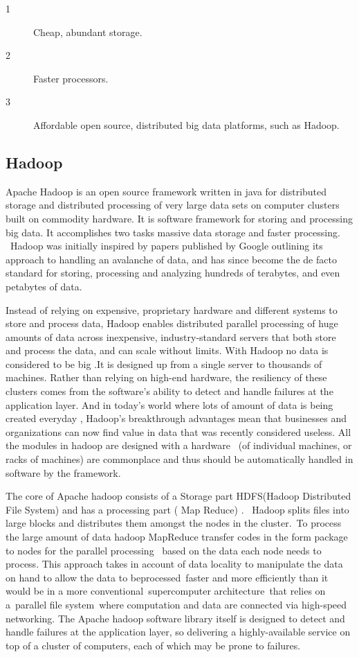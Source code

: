 \begin{description}
\vspace*{-2mm}
\item[1]Cheap, abundant storage.
\vspace*{-2mm}
\item[2]Faster processors.
\vspace*{-2mm}
\item[3]Affordable open source, distributed big data platforms, such as Hadoop.
\end{description}

\subsection{Hadoop}\cite{hadoop}
Apache Hadoop is an open source framework written in java for distributed storage and distributed processing of very large data sets on computer clusters built on commodity hardware. It is software framework for storing and processing big data.  It accomplishes two tasks massive data storage and faster processing.  Hadoop was initially inspired by papers published by Google outlining its approach to handling an avalanche of data, and has since become the de facto standard for storing,    processing and analyzing hundreds of terabytes, and even petabytes of data.  

Instead of relying on expensive, proprietary hardware and different systems to store and process data, Hadoop enables distributed parallel processing of huge amounts of data across inexpensive, industry-standard servers that both store and process the data, and can scale without limits. With Hadoop no data is considered to be big .It is designed up from a single server to thousands of machines. Rather than relying on high-end hardware, the resiliency of these clusters comes from the software's ability to detect and handle failures at the application layer.  And in today’s world where lots of amount of data is being created everyday , Hadoop’s breakthrough advantages mean that businesses and organizations can now find value in data that was recently considered useless. All the modules in hadoop are designed with a hardware  (of individual machines, or racks of machines) are commonplace and thus should be automatically handled in software by the framework.

The core of Apache hadoop consists of a Storage part HDFS(Hadoop Distributed File System) and has a processing part ( Map Reduce) .  Hadoop splits files into large blocks and distributes them amongst the nodes in the cluster. To process the large amount of data hadoop MapReduce transfer codes in the form package to nodes for the parallel processing  based on the data each node needs to process. This approach takes in account of data locality to manipulate the data on hand to allow the data to beprocessed faster and more efficiently than it would be in a more conventional supercomputer architecture that relies on a parallel file system where computation and data are connected via high-speed networking. The Apache hadoop software  library itself is designed to detect and handle failures at the application layer, so delivering a highly-available service on top of a cluster of computers, each of which may be prone to failures.

